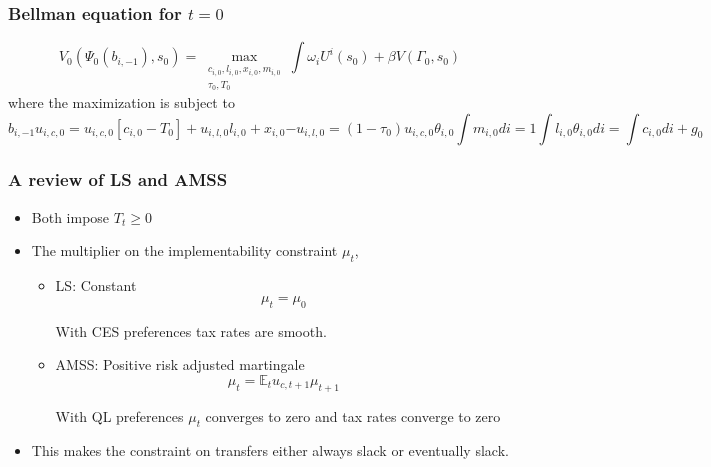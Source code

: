 \documentclass{beamer}
\begin{document}
\begin{frame}
\frametitle{Bellman equation for $t=0$}

 \begin{equation*}
V_0\left(\Psi_0(b_{i,-1}), s_0\right) = \max_{\substack{c_{i,0},l_{i,0},x_{i,0},m_{i,0}\\ \tau_0,T_0}} {\int \omega_i U^i(s_0) + \beta V\left(\Gamma_0, s_0\right)}
\end{equation*}
where the maximization is subject to
\begin{subequations}
\begin{equation*}
\label{eq-imp}
b_{i,-1}u_{i,c,0} = u_{i,c,0}[c_{i,0}-T_0]+u_{i,l,0}l_{i,0}+x_{i,0}
\end{equation*}



\begin{equation*}
\label{eq-wages}
-u_{i,l,0}=(1-\tau_0) u_{i,c,0} \theta_{i,0}
\end{equation*}


\begin{equation*}
\label{eq-norm-m}
\int m_{i,0} di=1
\end{equation*}

\begin{equation*}
\label{eq-resources}
\int l_{i,0} \theta_{i,0} di = \int c_{i,0} di+g_0
\end{equation*}
\end{subequations}


\end{frame}

\begin{frame}
 \frametitle{A review of LS and AMSS}
 \begin{itemize}
  \item Both impose $T_t\geq0$
  \item The multiplier on the implementability constraint $\mu_t$,
  \begin{itemize}
   \item LS: Constant\[\mu_t=\mu_0\]
   
   With CES preferences tax rates are smooth.
   
   \item AMSS: Positive risk adjusted martingale \[\mu_t=\mathbb{E}_tu_{c,t+1}\mu_{t+1}\]
  
  With QL preferences $\mu_t$ converges to zero and tax rates converge to zero
  
  \end{itemize}
\item This makes the constraint on transfers either always slack or eventually slack.
 \end{itemize}

\end{frame}
\end{document}
